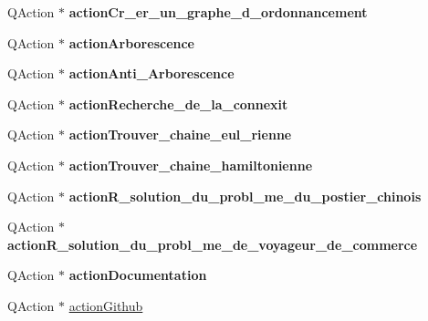\begin{DoxyCompactItemize}
\item 
\mbox{\label{classUi__MainWindow_abacb71055d4723ae0a22bab4db9aae59}} 
Q\+Action $\ast$ {\bfseries action\+Cr\+\_\+er\+\_\+un\+\_\+graphe\+\_\+d\+\_\+ordonnancement}
\item 
\mbox{\label{classUi__MainWindow_a3ef475096bd460666c66f983ae91e88e}} 
Q\+Action $\ast$ {\bfseries action\+Arborescence}
\item 
\mbox{\label{classUi__MainWindow_ac78df5d60ef992187483bbb426e5607c}} 
Q\+Action $\ast$ {\bfseries action\+Anti\+\_\+\+Arborescence}
\item 
\mbox{\label{classUi__MainWindow_a2fcff76fef286145ea67babd4a2d8734}} 
Q\+Action $\ast$ {\bfseries action\+Recherche\+\_\+de\+\_\+la\+\_\+connexit}
\item 
\mbox{\label{classUi__MainWindow_a1617c5e69ee2257dfa8038fbf5f45a3c}} 
Q\+Action $\ast$ {\bfseries action\+Trouver\+\_\+chaine\+\_\+eul\+\_\+rienne}
\item 
\mbox{\label{classUi__MainWindow_ae4491db939bf4a5dc73138082130c288}} 
Q\+Action $\ast$ {\bfseries action\+Trouver\+\_\+chaine\+\_\+hamiltonienne}
\item 
\mbox{\label{classUi__MainWindow_ab0910c137edb56ca1be1c02a441fe4f3}} 
Q\+Action $\ast$ {\bfseries action\+R\+\_\+solution\+\_\+du\+\_\+probl\+\_\+me\+\_\+du\+\_\+postier\+\_\+chinois}
\item 
\mbox{\label{classUi__MainWindow_ab900eed36c2b5253fe4b77b175e52163}} 
Q\+Action $\ast$ {\bfseries action\+R\+\_\+solution\+\_\+du\+\_\+probl\+\_\+me\+\_\+de\+\_\+voyageur\+\_\+de\+\_\+commerce}
\item 
\mbox{\label{classUi__MainWindow_abf537e264c22ef9e83c99c2785b7eb96}} 
Q\+Action $\ast$ {\bfseries action\+Documentation}
\item 
\mbox{\label{classUi__MainWindow_aabf662c2bb5b37ca801aa0baa71eab36}} 
Q\+Action $\ast$ \hyperlink{classUi__MainWindow_aabf662c2bb5b37ca801aa0baa71eab36}{action\+Github}

\end{DoxyCompactItemize}

